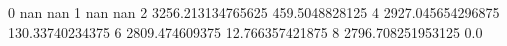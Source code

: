 0 nan nan
1 nan nan
2 3256.213134765625 459.5048828125
4 2927.045654296875 130.33740234375
6 2809.474609375 12.766357421875
8 2796.708251953125 0.0
